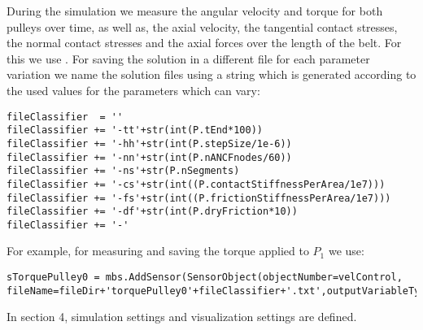 \item{During the simulation we measure the angular velocity and torque for both pulleys over time, as well as, the axial velocity, the tangential contact stresses, the normal contact stresses and the axial forces over the length of the belt. For this we use . For saving the solution in a different file for each parameter variation we name the solution files using a string which is generated according to the used values for the parameters which can vary:
\pythonstyle
\begin{tcolorbox}\begin{lstlisting}
fileClassifier  = ''
fileClassifier += '-tt'+str(int(P.tEnd*100))
fileClassifier += '-hh'+str(int(P.stepSize/1e-6))
fileClassifier += '-nn'+str(int(P.nANCFnodes/60))
fileClassifier += '-ns'+str(P.nSegments)
fileClassifier += '-cs'+str(int((P.contactStiffnessPerArea/1e7)))
fileClassifier += '-fs'+str(int((P.frictionStiffnessPerArea/1e7)))
fileClassifier += '-df'+str(int(P.dryFriction*10))
fileClassifier += '-' 
\end{lstlisting}\end{tcolorbox} 
For example, for measuring and saving the torque applied to $P_1$ we use:
\pythonstyle
\begin{tcolorbox}\begin{lstlisting}
sTorquePulley0 = mbs.AddSensor(SensorObject(objectNumber=velControl, fileName=fileDir+'torquePulley0'+fileClassifier+'.txt',outputVariableType=exu.OutputVariableType.Force))
\end{lstlisting}\end{tcolorbox}
}    
\ei
\item{In section 4, simulation settings and visualization settings are defined.}
